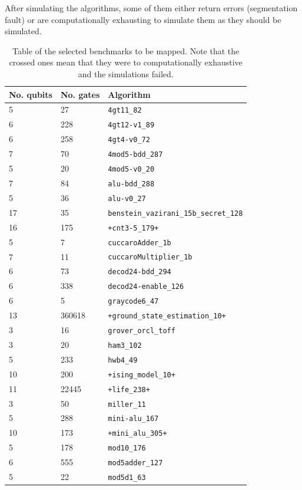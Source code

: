 After simulating the algorithms, some of them either return errors (segmentation fault) or are computationally exhausting to simulate them as they should be simulated.

\begin{table}[htbp]
\caption{\label{tab:org8210403}
Table of the selected benchmarks to be mapped. Note that the crossed ones mean that they were to computationally exhaustive and the simulations failed.}
\centering
\begin{tabular}{lll}
\hline
No. qubits & No. gates & Algorithm\\
\hline
5 & 27 & \texttt{4gt11\_82}\\
6 & 228 & \texttt{4gt12-v1\_89}\\
6 & 258 & \texttt{4gt4-v0\_72}\\
7 & 70 & \texttt{4mod5-bdd\_287}\\
5 & 20 & \texttt{4mod5-v0\_20}\\
7 & 84 & \texttt{alu-bdd\_288}\\
5 & 36 & \texttt{alu-v0\_27}\\
17 & 35 & \texttt{benstein\_vazirani\_15b\_secret\_128}\\
16 & 175 & \texttt{+cnt3-5\_179+}\\
5 & 7 & \texttt{cuccaroAdder\_1b}\\
7 & 11 & \texttt{cuccaroMultiplier\_1b}\\
6 & 73 & \texttt{decod24-bdd\_294}\\
6 & 338 & \texttt{decod24-enable\_126}\\
6 & 5 & \texttt{graycode6\_47}\\
13 & 360618 & \texttt{+ground\_state\_estimation\_10+}\\
3 & 16 & \texttt{grover\_orcl\_toff}\\
3 & 20 & \texttt{ham3\_102}\\
5 & 233 & \texttt{hwb4\_49}\\
10 & 200 & \texttt{+ising\_model\_10+}\\
11 & 22445 & \texttt{+life\_238+}\\
3 & 50 & \texttt{miller\_11}\\
5 & 288 & \texttt{mini-alu\_167}\\
10 & 173 & \texttt{+mini\_alu\_305+}\\
5 & 178 & \texttt{mod10\_176}\\
6 & 555 & \texttt{mod5adder\_127}\\
5 & 22 & \texttt{mod5d1\_63}\\

\end{tabular}
\end{table}
